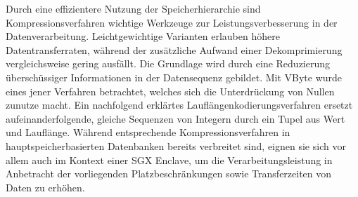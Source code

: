 Durch eine effizientere Nutzung der Speicherhierarchie sind Kompressionsverfahren wichtige Werkzeuge zur Leistungsverbesserung in der Datenverarbeitung. Leichtgewichtige Varianten erlauben höhere Datentransferraten, während der zusätzliche Aufwand einer Dekomprimierung vergleichsweise gering ausfällt. Die Grundlage wird durch eine Reduzierung überschüssiger Informationen in der Datensequenz gebildet. Mit VByte wurde eines jener Verfahren betrachtet, welches sich die Unterdrückung von Nullen zunutze macht. Ein nachfolgend erklärtes Lauflängenkodierungsverfahren ersetzt aufeinanderfolgende, gleiche Sequenzen von Integern durch ein Tupel aus Wert und Lauflänge. Während entsprechende Kompressionsverfahren in hauptspeicherbasierten Datenbanken bereits verbreitet sind, eignen sie sich vor allem auch im Kontext einer \ac{SGX} Enclave, um die Verarbeitungsleistung in Anbetracht der vorliegenden Platzbeschränkungen sowie Transferzeiten von Daten zu erhöhen.